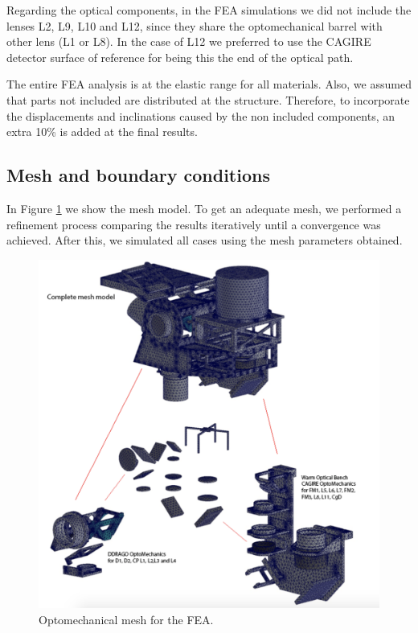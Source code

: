 \documentclass{report}
\begin{document}
Regarding the optical components, in the FEA simulations we did not include the lenses L2, L9, L10 and L12, since they share the optomechanical barrel with other lens (L1 or L8). In the case of L12 we preferred to use the CAGIRE detector surface of reference for being this the end of the optical path.

The entire FEA analysis is at the elastic range for all materials. Also, we assumed that parts not included are distributed at the structure. Therefore, to incorporate the displacements and inclinations caused by the non included components, an extra 10\% is added at the final results. 

\subsection{Mesh and boundary conditions}

In Figure \ref{figure:FEAmesh} we show the mesh model. To get an adequate mesh, we performed a refinement process comparing the results iteratively until a convergence was achieved. After this, we simulated all cases using the mesh parameters obtained.

\begin{figure}
\centering
\includegraphics[width=0.9\linewidth]{figures/FEAmesh.png}
\caption{Optomechanical mesh for the FEA.}
\label{figure:FEAmesh}
\end{figure}
\end{document}
